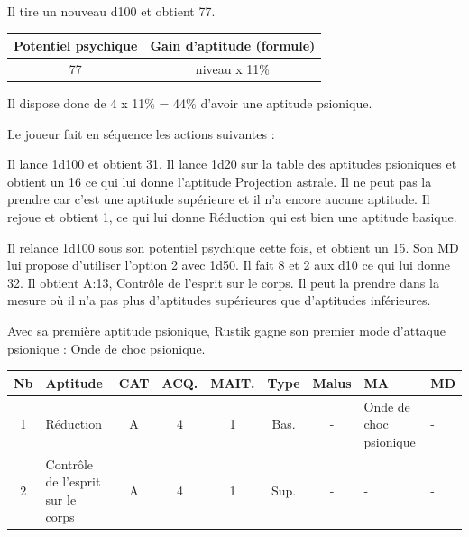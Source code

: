 \documentclass[11pt]{article}
\begin{document}
{\bigskip

Il tire un nouveau d100 et obtient 77.

\bigskip

\begin{tabular}{|c|c|}
\hline
\textbf{Potentiel psychique} & \textbf{Gain d'aptitude (formule)}\\ \hline
77 & niveau x 11\% \\ \hline
\end{tabular}

\bigskip

Il dispose donc de 4 x 11\% = 44\% d'avoir une aptitude psionique.

\bigskip

Le joueur fait en séquence les actions suivantes :

\bigskip

Il lance 1d100 et obtient 31. Il lance 1d20 sur la table des aptitudes psioniques et obtient un 16 ce qui lui donne l'aptitude Projection astrale. Il ne peut pas la prendre car c'est une aptitude supérieure et il n'a encore aucune aptitude. Il rejoue et obtient 1, ce qui lui donne Réduction qui est bien une aptitude basique.

\bigskip

Il relance 1d100 sous son potentiel psychique cette fois, et obtient un 15. Son MD lui propose d'utiliser l'option 2 avec 1d50. Il fait 8 et 2 aux d10 ce qui lui donne 32. Il obtient A:13, Contrôle de l'esprit sur le corps. Il peut la prendre dans la mesure où il n'a pas plus d'aptitudes supérieures que d'aptitudes inférieures.

\bigskip

Avec sa première aptitude psionique, Rustik gagne son premier mode d'attaque psionique : Onde de choc psionique.

\bigskip

\begin{tabular}{|c|p{3cm}|c|c|c|c|c|p{2.4cm}|p{2.4cm}|}
\hline
\textbf{Nb} & \textbf{Aptitude} & \textbf{CAT} & \textbf{ACQ.} & \textbf{MAIT.}  & \textbf{Type} & \textbf{Malus} & \textbf{MA} & \textbf{MD} \\ \hline
1 & Réduction                           & A & 4 & 1 & Bas. & - & Onde de choc psionique & - \\ \hline
2 & Contrôle de l'esprit sur le corps   & A & 4 & 1 & Sup. & - & - & - \\ \hline
\end{tabular}

\bigskip

}
\end{document}
